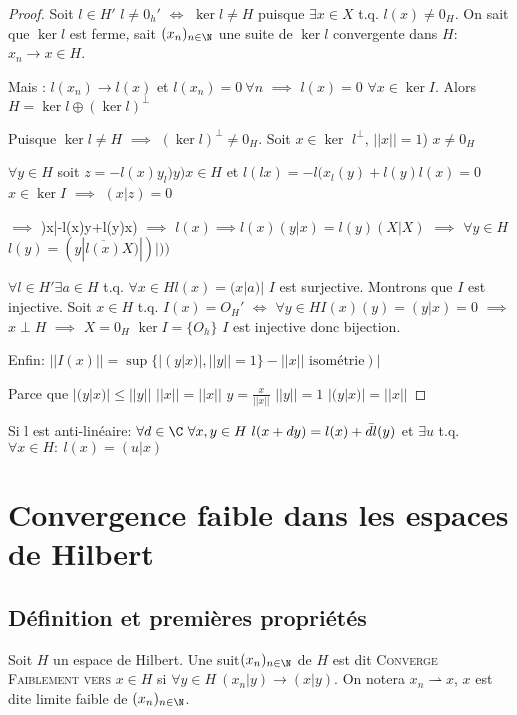 \begin{proof}
	Soit $l\in H'$ $l≠0_h'$ $\iff$ $\ker l≠H$ puisque $\exists x \in X$ t.q. $l(x)≠0_H$. On sait que $\ker l$ est ferme, sait $(x_n)_{n\in\N}$ une suite de $\ker l$ convergente dans $H$: $x_n\to x\in H$. 
	
	Mais : $l(x_n)\to  l(x)$ et $l(x_n)=0\ \forall n$ $\implies$  $l(x)=0$ $\forall x\in \ker I$. Alors $H=\ker l \oplus (\ker l )^\perp$
	
	Puisque $\ker l ≠H$ $\implies$  $(\ker l)^\perp≠0_H$. Soit $x\in \ker $ $l ^\perp$, $||x||=1$) $x≠0_H$
	
	$\forall y\in H$ soit $z=-l(x)y_l)y)x\in H$ et $l(lx)=-l(x_l(y)+l(y)l(x)=0$ $x\in \ker I$ $\implies$  $(x|z)=0$
	
	$\implies$  )x|-l(x)y+l(y)x) $\implies$  $l(x) \implies  l(x)(y|x)=l(y)(X|X)$ $\implies$ $\forall y\in H$ $l(y)=(y|\overline{l(x)}X)|)|))$
	

	$\forall l\in H' \exists a\in H$ t.q. $\forall x\in H l(x)=(x|a)|$ $I$ est surjective. Montrons que $I$ est injective.
	Soit $x\in H$ t.q. $I(x)=O_H'$ $\iff$ $\forall y\in H I(x)(y)=(y|x)=0$ $\implies$  $x\perp H$ $\implies$  $X=0_H$ $\ker I=\{O_h\}$ $I$ est injective donc bijection.


Enfin: $||I(x)||=\sup\{|(y|x)|, ||y||=1\} -||x||\text{ isométrie})|$

Parce que $|(y|x)|≤||y||$ $||x||=||x||$ $y=\frac x{||x||}$ $||y||=1$ $|(y|x)|=||x||$
\end{proof}

\begin{remark}
	Si l est anti-linéaire: $\forall d\in \C\ \forall x,y\in H\ l(x+dy)=l(x)+\bar d l(y)$ et $\exists u $ t.q. $\forall x\in H:\  l(x)=(u|x)$
\end{remark}


\section{Convergence faible dans les espaces de Hilbert} %

\subsection{Définition et premières propriétés} %
\label{sub:definition_et_premieres_proprietes}

\begin{definition}
	Soit $H$ un espace de Hilbert. Une suit$ (x_n)_{n\in\N}$ de $H$ est dit \textsc{Converge Faiblement vers} $x\in H$ si $\forall y\in H\ (x_n|y)\to (x|y)$. On notera $x_n\rightharpoonup x$, $x$ est dite limite faible de $(x_n)_{n\in\N}$.
\end{definition}

